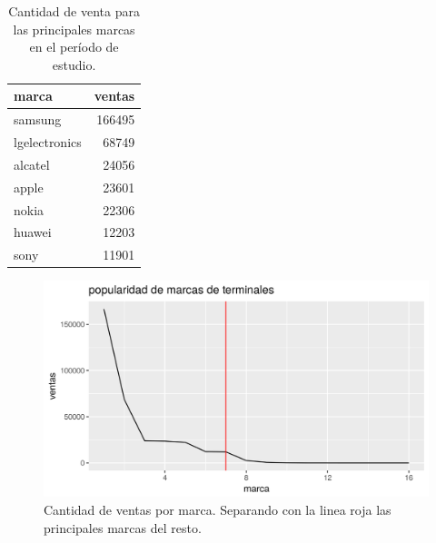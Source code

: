 \begin{table}[ht]
\centering
\begin{tabular}{lr}
  \hline
marca & ventas \\ 
  \hline
samsung & 166495 \\ 
  lgelectronics & 68749 \\ 
  alcatel & 24056 \\ 
  apple & 23601 \\ 
  nokia & 22306 \\ 
  huawei & 12203 \\ 
  sony & 11901 \\ 
   \hline
\end{tabular}
\caption{Cantidad de venta para las principales marcas en el período de estudio.} 
\label{tab:marcas_top}
\end{table}


\begin{figure}[bhtp]
\begin{center}
\includegraphics[scale=0.6]{figures/ejemplo.png}
\caption{Cantidad de ventas por marca. Separando con la linea roja las principales marcas del resto.}
\label{fig:marcas}
\end{center}
\end{figure}



